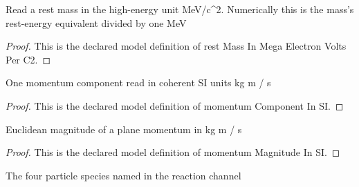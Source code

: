 \begin{definition}
  \label{def:physics:phyx-mini-0554:phyxminiproblems-problemphyxmini0554-restmassinmegaelectronvoltsperc2}
  Read a rest mass in the high-energy unit MeV/c\textasciicircum{}2. Numerically this is the mass's rest-energy equivalent divided by one MeV
\end{definition}
\begin{proof}
  This is the declared model definition of rest Mass In Mega Electron Volts Per C2.
\end{proof}
\begin{definition}
  \label{def:physics:phyx-mini-0554:phyxminiproblems-problemphyxmini0554-momentumcomponentinsi}
  One momentum component read in coherent SI units kg m / s
\end{definition}
\begin{proof}
  This is the declared model definition of momentum Component In SI.
\end{proof}
\begin{definition}
  \label{def:physics:phyx-mini-0554:phyxminiproblems-problemphyxmini0554-momentummagnitudeinsi}
  Euclidean magnitude of a plane momentum in kg m / s
\end{definition}
\begin{proof}
  This is the declared model definition of momentum Magnitude In SI.
\end{proof}
\begin{definition}
  \label{def:physics:phyx-mini-0554:phyxminiproblems-problemphyxmini0554-particlelabel}
  The four particle species named in the reaction channel
\end{definition}

